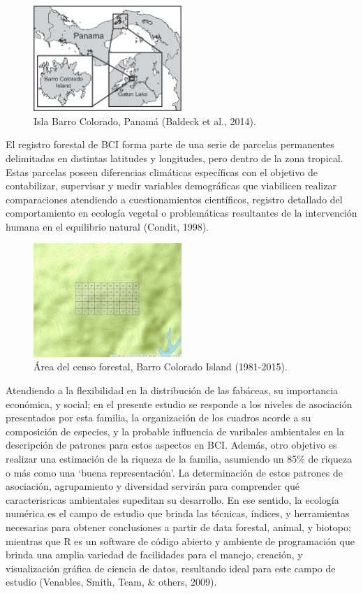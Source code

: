 \documentclass[11pt,]{article}
\begin{document}
\begin{figure}
\centering
\includegraphics[width=0.50000\textwidth]{Map-of-Barro-Colorado-Island-BCI-Panama.png}
\caption{Isla Barro Colorado, Panamá (Baldeck et al., 2014).}
\end{figure}

El registro forestal de BCI forma parte de una serie de parcelas
permanentes delimitadas en distintas latitudes y longitudes, pero dentro
de la zona tropical. Estas parcelas poseen diferencias climáticas
específicas con el objetivo de contabilizar, supervisar y medir
variables demográficas que viabilicen realizar comparaciones atendiendo
a cuestionamientos científicos, registro detallado del comportamiento en
ecología vegetal o problemáticas resultantes de la intervención humana
en el equilibrio natural (Condit, 1998).

\begin{figure}
\centering
\includegraphics[width=0.50000\textwidth]{mapa_cuadros.png}
\caption{Área del censo forestal, Barro Colorado Island (1981-2015).}
\end{figure}

Atendiendo a la flexibilidad en la distribución de las fabáceas, su
importancia económica, y social; en el presente estudio se responde a
los niveles de asociación presentados por esta familia, la organización
de los cuadros acorde a su composición de especies, y la probable
influencia de varibales ambientales en la descripción de patrones para
estos aspectos en BCI. Además, otro objetivo es realizar una estimación
de la riqueza de la familia, asumiendo un 85\% de riqueza o más como una
`buena representación'. La determinación de estos patrones de
asociación, agrupamiento y diversidad servirán para comprender qué
caracterisricas ambientales supeditan su desarrollo. En ese sentido, la
ecología numérica es el campo de estudio que brinda las técnicas,
índices, y herramientas necesarias para obtener conclusiones a partir de
data forestal, animal, y biotopo; mientras que R es un software de
código abierto y ambiente de programación que brinda una amplia variedad
de facilidades para el manejo, creación, y visualización gráfica de
ciencia de datos, resultando ideal para este campo de estudio (Venables,
Smith, Team, \& others, 2009).
\end{document}
